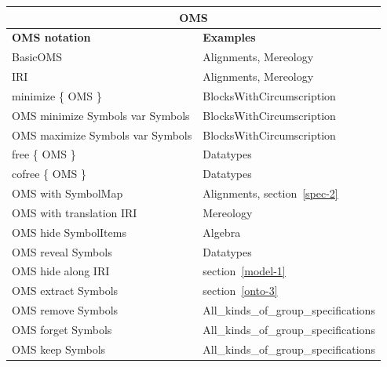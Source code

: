 \documentclass[10pt,fleqn,%
\ifpretendfinal
final%
\else
draft%
\fi,
]{scrreprt}
\begin{document}
\begin{tabular}{|l|l|}\hline
\multicolumn{2}{|c|}{\textbf{OMS}}\\\hline
\textbf{OMS notation} & \textbf{Examples} \\\hline
BasicOMS  & Alignments, Mereology \\\hline
IRI  & Alignments, Mereology \\\hline
minimize \{ OMS \}  & BlocksWithCircumscription \\\hline
OMS minimize Symbols var Symbols  & BlocksWithCircumscription \\\hline
OMS maximize Symbols var Symbols  & BlocksWithCircumscription \\\hline
free \{ OMS \} & Datatypes \\\hline
cofree \{ OMS \} & Datatypes \\\hline
OMS with SymbolMap  & Alignments,  section~\ref{spec-2} \\\hline
OMS with translation IRI  & Mereology \\\hline
OMS hide SymbolItems  &  Algebra \\\hline
OMS reveal Symbols  & Datatypes \\\hline
OMS hide along IRI  & section~\ref{model-1} \\\hline
OMS extract Symbols  & section~\ref{onto-3} \\\hline
OMS remove Symbols  & All\_kinds\_of\_group\_specifications \\\hline
OMS forget Symbols  & All\_kinds\_of\_group\_specifications \\\hline
OMS keep Symbols  & All\_kinds\_of\_group\_specifications \\\hline

\end{tabular}
\end{document}
